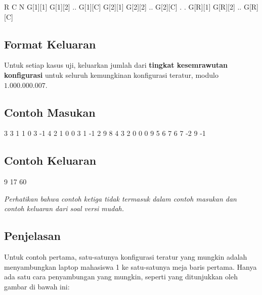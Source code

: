 \documentclass[../main_problemset.tex]{subfiles} %
\begin{document}
\begin{lcverbatim}
R C N
G[1][1] G[1][2] .. G[1][C]
G[2][1] G[2][2] .. G[2][C]
.
.
G[R][1] G[R][2] .. G[R][C]
\end{lcverbatim}

\subsection*{Format Keluaran}

Untuk setiap kasus uji, keluarkan jumlah dari \textbf{tingkat kesemrawutan konfigurasi} untuk seluruh kemungkinan konfigurasi teratur, modulo $ 1.000.000.007 $.

\vspace{.4cm}

\begin{minipage}[t]{0.5\textwidth}
\subsection*{Contoh Masukan}

\begin{lcverbatim}
3
3 1 1
0
3
-1
4 2 1
0 0
3 1
-1 2
9 8
4 3 2
0 0 0
9 5 6
7 6 7
-2 9 -1
\end{lcverbatim}
\end{minipage}
\begin{minipage}[t]{0.5\textwidth}
\subsection*{Contoh Keluaran}

\begin{lcverbatim}
9
17
60
\end{lcverbatim}
\end{minipage}

\textit{Perhatikan bahwa contoh ketiga tidak termasuk dalam contoh masukan dan contoh keluaran dari soal versi mudah.}

\subsection*{Penjelasan}

Untuk contoh pertama, satu-satunya konfigurasi teratur yang mungkin adalah menyambungkan laptop mahasiswa 1 ke satu-satunya meja baris pertama. Hanya ada satu cara penyambungan yang mungkin, seperti yang ditunjukkan oleh gambar di bawah ini:
\end{document}
